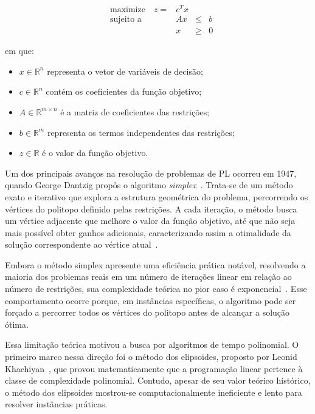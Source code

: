 \documentclass[11pt]{article}
\begin{document}
\[
    \begin{aligned}
    &\text{maximize} \quad  z  = &c^T x \\
    &\text{sujeito a} \quad & Ax & \leq & b \\
    & & x & \geq & 0
    \end{aligned}
\]

em que:
\begin{itemize}
    \item $x \in \mathbb{R}^n$ representa o vetor de variáveis de decisão;
    \item $c \in \mathbb{R}^n$ contém os coeficientes da função objetivo;
    \item $A \in \mathbb{R}^{m \times n}$ é a matriz de coeficientes das restrições;
    \item $b \in \mathbb{R}^m$ representa os termos independentes das restrições;
    \item $z \in \mathbb{R}$ é o valor da função objetivo.
\end{itemize}

Um dos principais avanços na resolução de problemas de PL ocorreu em 1947, quando George Dantzig propôs o algoritmo \emph{simplex}~\cite{Nash2000}. Trata-se de um método exato e iterativo que explora a estrutura geométrica do problema, percorrendo os vértices do politopo definido pelas restrições. A cada iteração, o método busca um vértice adjacente que melhore o valor da função objetivo, até que não seja mais possível obter ganhos adicionais, caracterizando assim a otimalidade da solução correspondente ao vértice atual~\cite{Goldbarg2005}.

Embora o método simplex apresente uma eficiência prática notável, resolvendo a maioria dos problemas reais em um número de iterações linear em relação ao número de restrições, sua complexidade teórica no pior caso é exponencial~\cite{klee1972}. Esse comportamento ocorre porque, em instâncias específicas, o algoritmo pode ser forçado a percorrer todos os vértices do politopo antes de alcançar a solução ótima.

Essa limitação teórica motivou a busca por algoritmos de tempo polinomial. O primeiro marco nessa direção foi o método dos elipsoides, proposto por Leonid Khachiyan~\cite{khachiyan1979}, que provou matematicamente que a programação linear pertence à classe de complexidade polinomial. Contudo, apesar de seu valor teórico histórico, o método dos elipsoides mostrou-se computacionalmente ineficiente e lento para resolver instâncias práticas.
\end{document}
